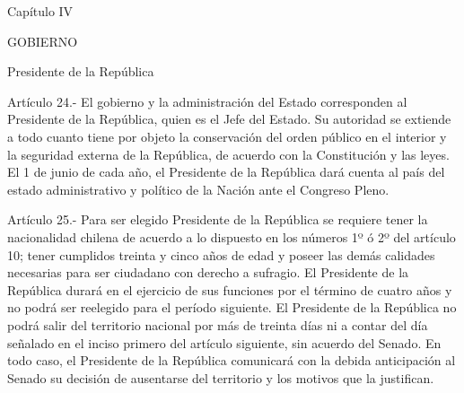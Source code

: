     Capítulo IV

    GOBIERNO



    Presidente de la República



    Artículo 24.- El gobierno y la administración del Estado corresponden al Presidente de la República, quien es el Jefe del Estado.
    Su autoridad se extiende a todo cuanto tiene por objeto la conservación del orden público en el interior y la seguridad externa de la República, de acuerdo con la Constitución y las leyes.
    El 1 de junio de cada año, el Presidente de la República dará cuenta al país del estado administrativo y político de la Nación ante el Congreso Pleno.



    Artículo 25.- Para ser elegido Presidente de la República se requiere tener la nacionalidad chilena de acuerdo a lo dispuesto en los números 1º ó 2º del artículo 10; tener cumplidos treinta y cinco años de edad y poseer las demás calidades necesarias para ser ciudadano con derecho a sufragio.
    El Presidente de la República durará en el ejercicio de sus funciones por el término de cuatro años y no podrá ser reelegido para el período siguiente.
    El Presidente de la República no podrá salir del territorio nacional por más de treinta días ni a contar del día señalado en el inciso primero del artículo siguiente, sin acuerdo del Senado.
    En todo caso, el Presidente de la República comunicará con la debida anticipación al Senado su decisión de ausentarse del territorio y los motivos que la justifican.



